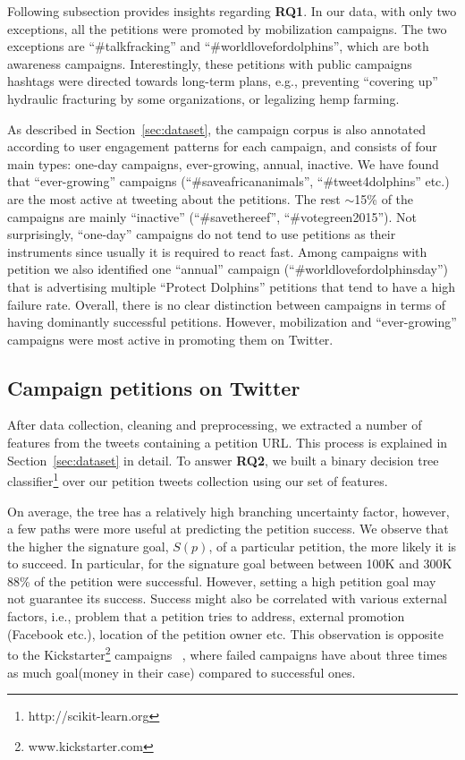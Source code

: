 Following subsection provides insights regarding \textbf{RQ1}.
In our data, with only two exceptions, all the petitions were promoted by mobilization campaigns. The two exceptions are ``\#talkfracking'' and ``\#worldlovefordolphins'', which are both awareness campaigns.
Interestingly, these petitions with public campaigns hashtags were directed towards long-term plans, e.g., preventing ``covering up'' hydraulic fracturing by some organizations, or legalizing hemp farming.

As described in Section~\ref{sec:dataset}, the campaign corpus is also annotated according to user engagement patterns for each campaign, and consists of four main types: one-day campaigns, ever-growing, annual, inactive.
We have found that ``ever-growing'' campaigns (``\#saveafricananimals'', ``\#tweet4dolphins'' etc.) are the most active at tweeting about the petitions.
The rest $\sim$15\% of the campaigns are mainly ``inactive'' (``\#savethereef'', ``\#votegreen2015'').
Not surprisingly, ``one-day'' campaigns do not tend to use petitions as their instruments since usually it is required to react fast.
Among campaigns with petition we also identified one ``annual'' campaign (``\#worldlovefordolphinsday'') that is advertising multiple ``Protect Dolphins'' petitions that tend to have a high failure rate.
Overall, there is no clear distinction between campaigns in terms of having dominantly successful petitions.
However, mobilization and ``ever-growing'' campaigns were most active in promoting them on Twitter.

\subsection{Campaign petitions on Twitter}
After data collection, cleaning and preprocessing, we extracted a number of features from the tweets containing a petition URL.
This process is explained in Section~\ref{sec:dataset} in detail.
To answer \textbf{RQ2}, we built a binary decision tree classifier\footnote{ http://scikit-learn.org } over our petition tweets collection using our set of features.

On average, the tree has a relatively high branching uncertainty factor, however, a few paths were more useful at predicting the petition success.
We observe that the higher the signature goal, $S(p)$, of a particular petition, the more likely it is to succeed.
In particular, for the signature goal between between 100K and 300K 88\% of the petition were successful.
However, setting a high petition goal may not guarantee its success. Success might also be correlated with various external factors, i.e., problem that a petition tries to address, external promotion (Facebook etc.), location of the petition owner etc.
This observation is opposite to the Kickstarter\footnote{www.kickstarter.com} campaigns~\citeauthor{Etter2013} , where failed campaigns have about three times as much goal(money in their case) compared to successful ones.

